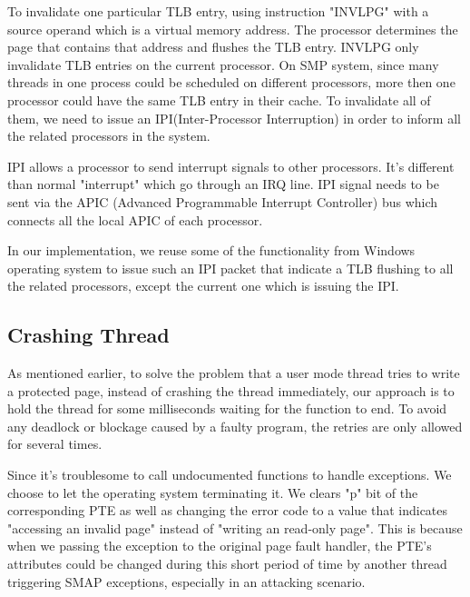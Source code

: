 To invalidate one particular TLB entry, using instruction "INVLPG" with a source operand which is a virtual memory address. The processor determines the page that contains that address and flushes the TLB entry. INVLPG only invalidate TLB entries on the current processor. On SMP system, since many threads in one process could be scheduled on different processors, more then one processor could have the same TLB entry in their cache. To invalidate all of them, we need to issue an IPI(Inter-Processor Interruption) in order to inform all the related processors in the system.

IPI allows a processor to send interrupt signals to other processors. It's different than normal "interrupt" which go through an IRQ line. IPI signal needs to be sent via the APIC (Advanced Programmable Interrupt Controller) bus which connects all the local APIC of each processor.

In our implementation, we reuse some of the functionality from Windows operating system to issue such an IPI packet that indicate a TLB flushing to all the related processors, except the current one which is issuing the IPI.

\subsection{Crashing Thread}

As mentioned earlier, to solve the problem that a user mode thread tries to write a protected page, instead of crashing the thread immediately, our approach is to hold the thread for some milliseconds waiting for the function to end. To avoid any deadlock or blockage caused by a faulty program, the retries are only allowed for several times. 

Since it's troublesome to call undocumented functions to handle exceptions. We choose to let the operating system terminating it. We clears "p" bit of the corresponding PTE as well as changing the error code to a value that indicates "accessing an invalid page" instead of "writing an read-only page". This is because when we passing the exception to the original page fault handler, the PTE's attributes could be changed during this short period of time by another thread triggering SMAP exceptions, especially in an attacking scenario. 




